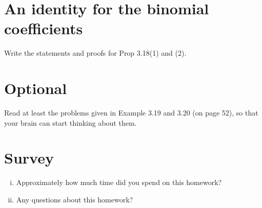 \documentclass[12pt]{amsart}
\begin{document}
\section{An identity for the binomial coefficients}
Write the statements and proofs for Prop 3.18(1) and (2).


\section{Optional}
Read at least the problems given in Example 3.19 and 3.20 (on page 52), so that your brain can start thinking about them.


\section{Survey}
\begin{enumerate}[i.] 
\item Approximately how much time did you spend on this homework?
\item Any questions about this homework?
\end{enumerate}
\end{document}
